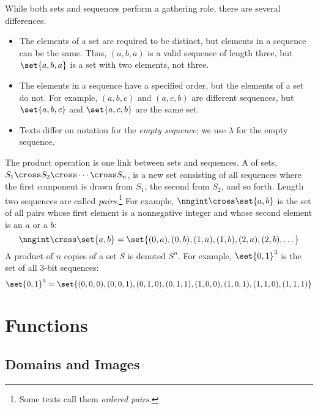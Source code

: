 While both sets and sequences perform a gathering role, there are
several differences.
\begin{itemize}

\item The elements of a set are required to be distinct, but elements in a
sequence can be the same.  Thus, $(a, b, a)$ is a valid sequence of length
three, but $\set{a, b, a}$ is a set with two elements, not three.

\item The elements in a sequence have a specified order, but the
  elements of a set do not.  For example, $(a, b, c)$ and $(a, c, b)$
  are different sequences, but $\set{a, b, c}$ and $\set{a, c, b}$ are
  the same set.

\item Texts differ on notation for the \emph{empty sequence};%
we use $\lambda$ for the empty sequence.
\end{itemize}

The product operation is one link between sets and sequences.  A
 of sets, $S_1 \cross S_2 \cross \cdots \cross
S_n$, is a new set consisting of all sequences where the first
component is drawn from $S_1$, the second from $S_2$, and so forth.
Length two sequences are called \emph{pairs}.\footnote{Some texts call
  them \emph{ordered pairs}.}  For example, $\nngint \cross
\set{a,b}$ is the set of all pairs whose first element is a
nonnegative integer and whose second element is an $a$ or a $b$:
\[
\nngint \cross \set{a,b}
    = \set{(0,a), (0,b), (1,a), (1,b), (2,a), (2, b), \dots}
\]
A product of $n$ copies of a set $S$ is denoted $S^n$.  For example,
$\set{0, 1}^3$ is the set of all $3$-bit sequences:
\[
\set{0, 1}^3 = \set{ (0,0,0), (0,0,1), (0,1,0), (0,1,1),
                     (1,0,0), (1,0,1), (1,1,0), (1,1,1) }
\]

\begin{problems}

\homeworkproblems
{}
\end{problems}


\section{Functions}\label{funcsubsec}


\subsection{Domains and Images}

